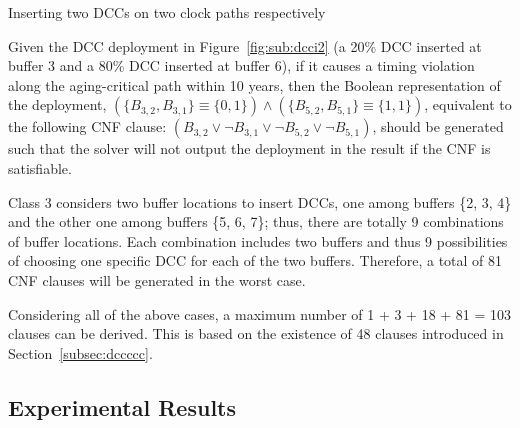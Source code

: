 \begin{class}
\label{class:c6}
Inserting two DCCs on two clock paths respectively

Given the DCC deployment in Figure~\ref{fig:sub:dcci2} (a 20\% DCC inserted at buffer 3 and a 80\% DCC inserted at buffer 6), if it causes a timing violation along the aging-critical path within 10 years, then the Boolean representation of the deployment, $\left(\{B_{3,2}, B_{3,1}\} \equiv \{0, 1\} \right) \land \left( \{B_{5,2}, B_{5,1}\} \equiv \{1, 1\} \right)$, equivalent to the following CNF clause: $\left(B_{3,2} \lor \neg B_{3,1} \lor \neg B_{5,2} \lor \neg B_{5,1} \right)$, should be generated such that the solver will not output the deployment in the result if the CNF is satisfiable.

Class 3 considers two buffer locations to insert DCCs, one among buffers \{2, 3, 4\} and the other one among buffers \{5, 6, 7\}; thus, there are totally 9 combinations of buffer locations. Each combination includes two buffers and thus 9 possibilities of choosing one specific DCC for each of the two buffers. Therefore, a total of 81 CNF clauses will be generated in the worst case.

Considering all of the above cases, a maximum number of 1 + 3 + 18 + 81 = 103 clauses can be derived. This is based on the existence of 48 clauses introduced in Section~\ref{subsec:dccccc}.

\end{class}

\subsection{Experimental Results}
\label{sec:TVA:experiment}